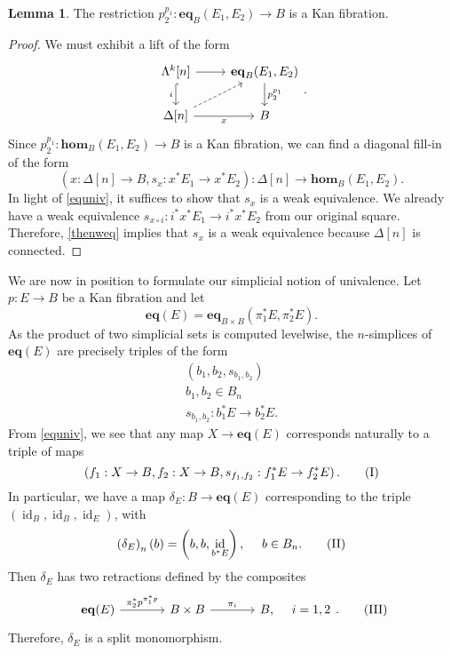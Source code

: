 \documentclass[10pt,letterpaper,cm]{nupset}
\theoremstyle{definition}
\theoremstyle{theorem}
\newtheorem{lemma}[definition]{Lemma}
\theoremstyle{remark}
\newcommand{\0}{\mathbf{0}}
\newcommand{\1}{\mathbf{1}}
\newcommand{\2}{\mathbf{2}}
\newcommand{\RomanNumeralCaps}[1]
    {\MakeUppercase{\romannumeral #1}}
\DeclareMathOperator{\idd}{id}
\begin{document}
\begin{lemma}\label{restKfib}
The restriction $p_2^{p_1}: \mathbf{eq}_B(E_1, E_2)\to B$ is a Kan fibration.
\end{lemma}
\begin{proof}
We must exhibit a lift of the form
\[
\begin{tikzcd}
{\Lambda^k[n]} \arrow[d, "i"', hook] \arrow[r] & {\mathbf{eq}_B(E_1, E_2)} \arrow[d, "p_2^{p_1}"] \\
{\Delta[n]} \arrow[r, "x"'] \arrow[ru, dashed] & B                                  
\end{tikzcd}.
\] Since $p_2^{p_1}: \mathbf{hom}_B(E_1, E_2)\to B$ is a Kan fibration, we can find a diagonal fill-in of the form $$\left(x: \Delta[n] \to B, s_x: x^{\ast}{E_1}\to x^{\ast}{E_2}\right) : \Delta[n] \to \mathbf{hom}_B(E_1, E_2).$$ In light of \eqref{equniv}, it suffices to show that $s_x$ is a weak equivalence. We already have a weak equivalence $s_{x\circ i} : i^{\ast}{x^{\ast}{E_1}}\to i^{\ast}{x^{\ast}{E_2}}$ from our original square. Therefore, \cref{thenweq} implies that $s_x$ is a weak equivalence because $\Delta[n]$ is connected.
\end{proof}

\medskip

We are now in position to formulate our simplicial notion of univalence. Let $p: E \to B$ be a Kan fibration and let
\[
\mathbf{eq}(E) = \mathbf{eq}_{B\times B}\left(\pi_1^{\ast}{E}, \pi_2^{\ast}{E}\right).
\]
As the product of two simplicial sets is computed levelwise, the $n$-simplices of $\mathbf{eq}(E)$ are precisely triples of the form 
\begin{gather*}
\left(b_1, b_2, s_{b_1, b_2}\right)
\\ b_1, b_2\in B_n
\\ s_{b_1, b_2} : b_1^{\ast}{E} \to b_2^{\ast}{E}.
\end{gather*}
From \eqref{equniv}, we see that any map $X\to \mathbf{eq}(E)$ corresponds naturally to a triple of maps
\[ \label{trips}
\left(f_1: X\to B, f_2: X\to B, s_{f_1, f_2}:f_1^{\ast}{E} \to f_2^{\ast}{E}\right). \tag{\RomanNumeralCaps{1}}
\] In particular, we have a map $\delta_E : B\to \mathbf{eq}(E)$ corresponding to the triple $\left(\idd_B, \idd_B, \idd_E\right)$, with 
\[ \label{deltaE}
\left(\delta_E\right)_n(b) = \left(b,b,\idd_{b^{\ast}{E}}\right), \ \quad b\in B_n. \tag{\RomanNumeralCaps{2}}
\]
Then $\delta_E$ has two retractions defined by the composites
\[
\begin{tikzcd}[column sep=large] \label{splitmono}
\mathbf{eq}(E) \arrow[r, "\pi_2^{\ast}{p}^{\pi_1^{\ast}{p}}"] & B\times B \arrow[r, "\pi_i"] & {B},\ \quad {i=1,2}
\end{tikzcd}. \tag{\RomanNumeralCaps{3}}
\] Therefore, $\delta_E$ is a split monomorphism.  
\end{document}
